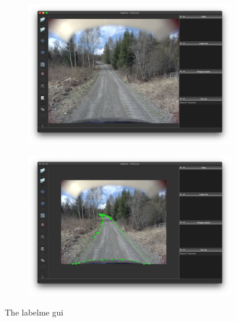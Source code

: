 \documentclass[USenglish]{ifimaster}  %
\begin{document}
\begin{figure}[H]
\begin{subfigure}{.6\textwidth}
\includegraphics[width=.75\linewidth]{bilder/labelme_gui.png}
\label{fig:gui}
\end{subfigure}
\hspace*{\fill} %
\begin{subfigure}{.6\textwidth}
\includegraphics[width=.75\linewidth]{bilder/annotating.png}
\label{fig:polygon}
\end{subfigure}
\caption{The labelme \ac{gui}}
\end{figure}
\end{document}
